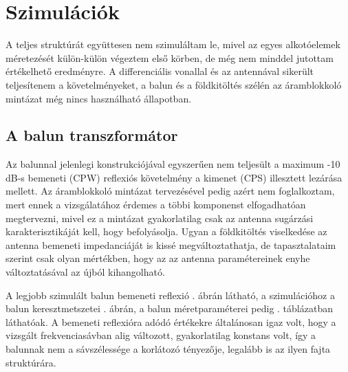 \chapter{Szimulációk}
A teljes struktúrát együttesen nem szimuláltam le, mivel az egyes alkotóelemek méretezését külön-külön végeztem első körben, de még nem minddel jutottam értékelhető eredményre. A differenciális vonallal és az antennával sikerült teljesítenem a követelményeket, a balun és a földkitöltés szélén az áramblokkoló mintázat még nincs használható állapotban.
\section{A balun transzformátor}
\par Az balunnal jelenlegi konstrukciójával egyszerűen nem teljesült a maximum -10 dB-s bemeneti (CPW) reflexiós követelmény a kimenet (CPS) illesztett lezárása mellett. Az áramblokkoló mintázat tervezésével pedig azért nem foglalkoztam, mert ennek a vizsgálatához érdemes a többi komponenst elfogadhatóan megtervezni, mivel ez a mintázat gyakorlatilag csak az antenna sugárzási karakterisztikáját kell, hogy befolyásolja. Ugyan a földkitöltés viselkedése az antenna bemeneti impedanciáját is kissé megváltoztathatja, de tapasztalataim szerint csak olyan mértékben, hogy az az antenna paramétereinek enyhe változtatásával az újból kihangolható.
\par A legjobb szimulált balun bemeneti reflexió . ábrán látható, a szimulációhoz a balun keresztmetszetei . ábrán, a balun méretparaméterei pedig . táblázatban láthatóak. A bemeneti reflexióra adódó értékekre általánosan igaz volt, hogy a vizsgált frekvenciasávban alig változott, gyakorlatilag konstans volt, így a balunnak nem a sávszélessége a korlátozó tényezője, legalább is az ilyen fajta struktúrára.

